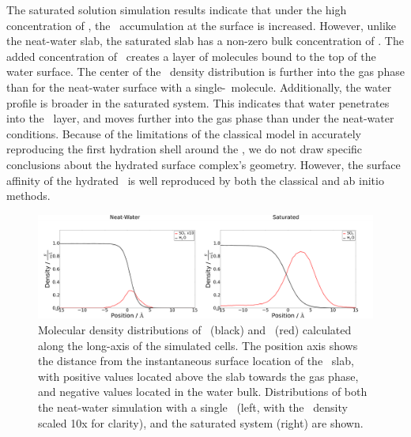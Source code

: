 The saturated solution simulation results indicate that under the high concentration of \suldiox, the \suldiox~accumulation at the surface is increased. However, unlike the neat-water slab, the saturated slab has a non-zero bulk concentration of \suldiox. The added concentration of \suldiox~creates a layer of molecules bound to the top of the water surface. The center of the \suldiox~density distribution is further into the gas phase than for the neat-water surface with a single-\suldiox~molecule. Additionally, the water profile is broader in the saturated system. This indicates that water penetrates into the \suldiox~layer, and moves further into the gas phase than under the neat-water conditions. Because of the limitations of the classical model in accurately reproducing the first hydration shell around the \suldiox, we do not draw specific conclusions about the hydrated surface complex's geometry. However, the surface affinity of the hydrated \suldiox~is well reproduced by both the classical and ab initio methods.\cite{Baer2010}

\begin{figure}[h!]
	\begin{center}
		\includegraphics[scale=1.0]{images/density/density.png}
		\caption{Molecular density distributions of \wat~(black) and \suldiox~(red) calculated along the long-axis of the simulated cells. The position axis shows the distance from the instantaneous surface location of the \wat~slab, with positive values located above the slab towards the gas phase, and negative values located in the water bulk. Distributions of both the neat-water simulation with a single \suldiox~(left, with the \suldiox~density scaled 10x for clarity), and the saturated system (right) are shown.}
		\label{fig:density}
	\end{center}
\end{figure}
